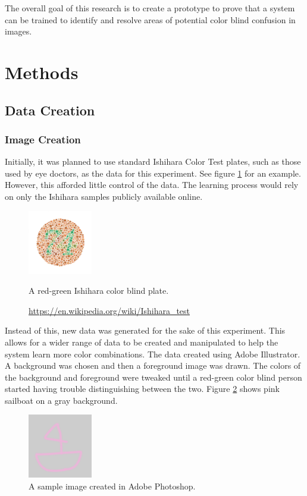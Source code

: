 \documentclass[12pt]{article}
\begin{document}
The overall goal of this research is to create a prototype to prove that a system can be trained to identify and resolve areas of potential color blind confusion in images.


\section{Methods}

\subsection{Data Creation}
\subsubsection{Image Creation}
Initially, it was planned to use standard Ishihara Color Test plates, such as those used by eye doctors, as the data for this experiment. See figure \ref{fig:ishi} for an example. However, this afforded little control of the data. The learning process would rely on only the Ishihara samples publicly available online. 

\begin{figure}[H]
	\centering
	\includegraphics[width=0.25\textwidth]{img/Ishihara}
	\caption{A red-green Ishihara color blind plate.}
	\caption*{\href{https://en.wikipedia.org/wiki/Ishihara\_test}{https://en.wikipedia.org/wiki/Ishihara\_test}}
	\label{fig:ishi}
\end{figure}


Instead of this, new data was generated for the sake of this experiment. This allows for a wider range of data to be created and manipulated to help the system learn more color combinations. The data created using Adobe Illustrator. A background was chosen and then a foreground image was drawn. The colors of the background and foreground were tweaked until a red-green color blind person started having trouble distinguishing between the two. Figure \ref{fig:data1} shows pink sailboat on a gray background.

\begin{figure}[H]
	\centering
	\includegraphics[width=0.25\textwidth]{img/data2.png}
	\caption{A sample image created in Adobe Photoshop.}
	\label{fig:data1}
\end{figure}
\end{document}
